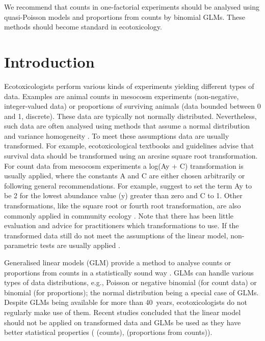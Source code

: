 We recommend that counts in one-factorial experiments should be analysed using quasi-Poisson models and proportions from counts by binomial GLMs.
These methods should become standard in ecotoxicology.

\section{Introduction}
\label{sec:usetheglm:Introduction}
Ecotoxicologists perform various kinds of experiments yielding different types of data.
Examples are animal counts in mesocosm experiments (non-negative, integer-valued data) or proportions of surviving animals (data bounded between 0 and 1, discrete).
These data are typically not normally distributed. 
Nevertheless, such data are often analysed using methods that assume a normal distribution and variance homogeneity \citep{wang_making_2011}. 
To meet these assumptions data are usually transformed.
For example, ecotoxicological textbooks \citep{newman_quantitative_2012} and guidelines \citep{epa_methods_2002,oecd_current_2006} advise that survival data should be transformed using an arcsine square root transformation. 
For count data from mesocosm experiments a log(Ay + C) transformation is usually applied, where the constants A and C are either chosen arbitrarily or following general recommendations. 
For example, \citet{van_den_brink_impact_2000} suggest to set the term Ay to be 2 for the lowest abundance value (y) greater than zero and C to 1. 
Other transformations, like the square root or fourth root transformation, are also commonly applied in community ecology \citep{anderson_navigating_2011}.
Note that there has been little evaluation and advice for practitioners which transformations to use.
If the transformed data still do not meet the assumptions of the linear model, non-parametric tests are usually applied \citep{wang_making_2011}.

Generalised linear models (GLM) provide a method to analyse counts or proportions from counts in a statistically sound way \citep{nelder_generalized_1972}.
GLMs can handle various types of data distributions, e.g., Poisson or negative binomial (for count data) or binomial (for proportions); the normal distribution being a special case of GLMs.
Despite GLMs being available for more than 40~years, ecotoxicologists do not regularly make use of them.
Recent studies concluded that the linear model should not be applied on transformed data and GLMs be used as they have better statistical properties (\citealt{ohara_not_2010,warton_many_2005} (counts), \citealt{warton_arcsine_2011} (proportions from counts)). 

